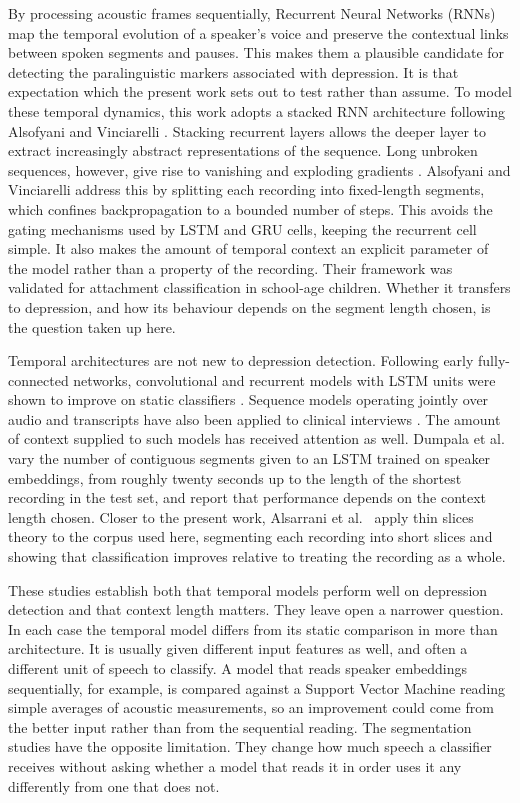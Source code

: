 \documentclass{mproj}
\begin{document}
By processing acoustic frames sequentially, Recurrent Neural Networks (RNNs) map the temporal evolution of a speaker's voice and preserve the contextual links between spoken segments and pauses. This makes them a plausible candidate for detecting the paralinguistic markers associated with depression. It is that expectation which the present work sets out to test rather than assume. To model these temporal dynamics, this work adopts a stacked RNN architecture following Alsofyani and Vinciarelli \cite{alsofyani2021}. Stacking recurrent layers allows the deeper layer to extract increasingly abstract representations of the sequence. Long unbroken sequences, however, give rise to vanishing and exploding gradients \cite{pascanu2013}. Alsofyani and Vinciarelli address this by splitting each recording into fixed-length segments, which confines backpropagation to a bounded number of steps. This avoids the gating mechanisms used by LSTM and GRU cells, keeping the recurrent cell simple. It also makes the amount of temporal context an explicit parameter of the model rather than a property of the recording. Their framework was validated for attachment classification in school-age children. Whether it transfers to depression, and how its behaviour depends on the segment length chosen, is the question taken up here.

Temporal architectures are not new to depression detection. Following early fully-connected networks, convolutional and recurrent models with LSTM units were shown to improve on static classifiers \cite{rejaibi2022,dumpala2021}. Sequence models operating jointly over audio and transcripts have also been applied to clinical interviews \cite{alhanai2018}. The amount of context supplied to such models has received attention as well. Dumpala et al.\ \cite{dumpala2021,dumpala2022} vary the number of contiguous segments given to an LSTM trained on speaker embeddings, from roughly twenty seconds up to the length of the shortest recording in the test set, and report that performance depends on the context length chosen. Closer to the present work, Alsarrani et al.\ \cite{alsarrani2022thin} apply thin slices theory to the corpus used here, segmenting each recording into short slices and showing that classification improves relative to treating the recording as a whole.

These studies establish both that temporal models perform well on depression detection and that context length matters. They leave open a narrower question. In each case the temporal model differs from its static comparison in more than architecture. It is usually given different input features as well, and often a different unit of speech to classify. A model that reads speaker embeddings sequentially, for example, is compared against a Support Vector Machine reading simple averages of acoustic measurements, so an improvement could come from the better input rather than from the sequential reading. The segmentation studies have the opposite limitation. They change how much speech a classifier receives without asking whether a model that reads it in order uses it any differently from one that does not.
\end{document}
